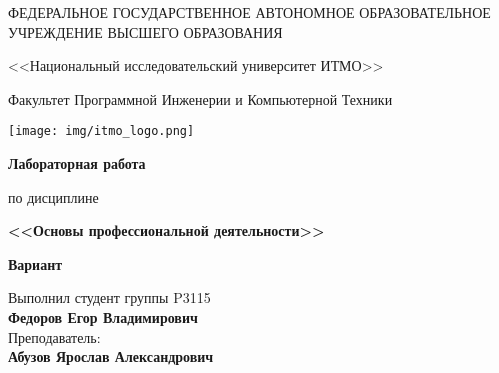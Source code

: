 \begin{titlepage}
    \thispagestyle{firststyle}
    \begin{center}

       ФЕДЕРАЛЬНОЕ ГОСУДАРСТВЕННОЕ АВТОНОМНОЕ ОБРАЗОВАТЕЛЬНОЕ УЧРЕЖДЕНИЕ ВЫСШЕГО ОБРАЗОВАНИЯ
        \vspace{0.5cm}

        <<Национальный исследовательский университет ИТМО>>

        Факультет Программной Инженерии и Компьютерной Техники

        \vspace{1cm}


        \texttt{[image: img/itmo\_logo.png]}

    \end{center}

    \vspace{1cm}

    \begin{center}
        \large
        \textbf{Лабораторная работа }

        по дисциплине
        
        \textbf{<<Основы профессиональной деятельности>>}

        \textbf{Вариант }
    \end{center}

    \vspace{2cm}

    \begin{flushright}
        Выполнил студент  группы P3115\\
        \textbf{Федоров Егор Владимирович} \\
        Преподаватель: \\
        \textbf{Абузов Ярослав Александрович}\\
    \end{flushright}

\end{titlepage}
